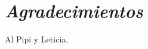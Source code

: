 
\chapter*{\textit{Agradecimientos}} %

\begin{flushright}

 

Al Pipi y Leticia.

 
\end{flushright}
